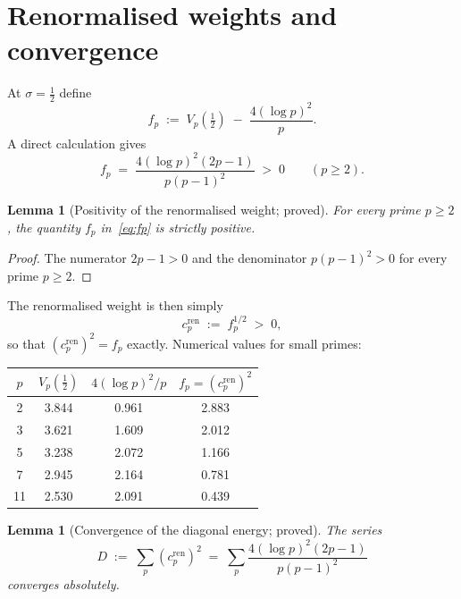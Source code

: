 \documentclass[11pt]{article}
\newtheorem{lemma}[theorem]{Lemma}
\newcommand{\cren}{c_p^{\mathrm{ren}}}
\begin{document}
\section{Renormalised weights and convergence}
\label{sec:renorm}

At $\sigma=\tfrac12$ define
\[
f_p \;:=\; V_p(\tfrac12) \;-\; \frac{4(\log p)^2}{p}.
\]
A direct calculation gives
\begin{equation}\label{eq:fp}
f_p \;=\; \frac{4(\log p)^2(2p-1)}{p(p-1)^2} \;>\; 0
\qquad (p\ge 2).
\end{equation}

\begin{lemma}[Positivity of the renormalised weight; proved]\label{lem:fp-pos}
For every prime $p\ge 2$, the quantity $f_p$
in~\eqref{eq:fp} is strictly positive.
\end{lemma}

\begin{proof}
The numerator $2p-1>0$ and the denominator $p(p-1)^2>0$ for
every prime $p\ge 2$.
\end{proof}

The renormalised weight is then simply
\begin{equation}\label{eq:cren}
\cren \;:=\; f_p^{1/2} \;>\; 0,
\end{equation}
so that $(\cren)^2 = f_p$ exactly.
Numerical values for small primes:

\begin{center}
\begin{tabular}{cccc}
\toprule
$p$ & $V_p(\tfrac12)$ & $4(\log p)^2/p$ & $f_p = (\cren)^2$ \\
\midrule
2  & 3.844 & 0.961 & 2.883 \\
3  & 3.621 & 1.609 & 2.012 \\
5  & 3.238 & 2.072 & 1.166 \\
7  & 2.945 & 2.164 & 0.781 \\
11 & 2.530 & 2.091 & 0.439 \\
\bottomrule
\end{tabular}
\end{center}

\begin{lemma}[Convergence of the diagonal energy; proved]\label{lem:D-conv}
The series
\begin{equation}\label{eq:D}
D \;:=\; \sum_p (\cren)^2
\;=\; \sum_p \frac{4(\log p)^2(2p-1)}{p(p-1)^2}
\end{equation}
converges absolutely.
\end{lemma}
\end{document}
